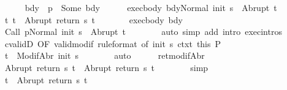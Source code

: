 \begin{isabellebody}
\ \ \ \ \isamarkupfalse%
\ bdy{\isacharcolon}\ {\isachardoublequoteopen}{\isasymGamma}\ p\ {\isacharequal}\ Some\ bdy{\isachardoublequoteclose}\isanewline
\ \ \ \ \isamarkupfalse%
\ exec{\isacharunderscore}body{\isacharcolon}\ {\isachardoublequoteopen}{\isasymGamma}{\isasymturnstile}{\isasymlangle}bdy{\isacharcomma}Normal\ {\isacharparenleft}init\ s{\isacharparenright}{\isasymrangle}\ {\isasymRightarrow}\ Abrupt\ t{\isacharprime}{\isachardoublequoteclose}\ \isanewline
\ \ \ \ \isamarkupfalse%
\ t{\isacharcolon}\ {\isachardoublequoteopen}t\ {\isacharequal}\ Abrupt\ {\isacharparenleft}return\ s\ t{\isacharprime}{\isacharparenright}{\isachardoublequoteclose}\isanewline
\ \ \ \ \isamarkupfalse%
\ \isamarkupfalse%
\ exec{\isacharunderscore}body\ bdy\isanewline
\ \ \ \ \isamarkupfalse%
\ {\isachardoublequoteopen}{\isasymGamma}{\isasymturnstile}{\isasymlangle}{\isacharparenleft}Call\ p{\isacharparenright}{\isacharcomma}Normal\ {\isacharparenleft}init\ s{\isacharparenright}{\isasymrangle}\ {\isasymRightarrow}\ Abrupt\ t{\isacharprime}{\isachardoublequoteclose}\isanewline
\ \ \ \ \ \ \isamarkupfalse%
\ {\isacharparenleft}auto\ simp\ add{\isacharcolon}\ intro{\isacharcolon}\ exec{\isachardot}intros{\isacharparenright}\isanewline
\ \ \ \ \isamarkupfalse%
\ cvalidD\ {\isacharbrackleft}OF\ valid{\isacharunderscore}modif\ {\isacharbrackleft}rule{\isacharunderscore}format{\isacharcomma}\ of\ {\isachardoublequoteopen}init\ s{\isachardoublequoteclose}{\isacharbrackright}\ ctxt{\isacharprime}\ this{\isacharbrackright}\ P\isanewline
\ \ \ \ \isamarkupfalse%
\ {\isachardoublequoteopen}t{\isacharprime}\ {\isasymin}\ ModifAbr\ {\isacharparenleft}init\ s{\isacharparenright}{\isachardoublequoteclose}\isanewline
\ \ \ \ \ \ \isamarkupfalse%
\ auto\isanewline
\ \ \ \ \isamarkupfalse%
\ ret{\isacharunderscore}modifAbr\ \isamarkupfalse%
\ {\isachardoublequoteopen}Abrupt\ {\isacharparenleft}return\ s\ t{\isacharprime}{\isacharparenright}\ {\isacharequal}\ Abrupt\ {\isacharparenleft}return{\isacharprime}\ s\ t{\isacharprime}{\isacharparenright}{\isachardoublequoteclose}\isanewline
\ \ \ \ \ \ \isamarkupfalse%
\ simp\isanewline
\ \ \ \ \isamarkupfalse%
\ \isamarkupfalse%
\ {\isachardoublequoteopen}t\ {\isacharequal}\ Abrupt\ {\isacharparenleft}return{\isacharprime}\ s\ t{\isacharprime}{\isacharparenright}{\isachardoublequoteclose}\ \isacommand{{\isachardot}}\isamarkupfalse%

\end{isabellebody}
